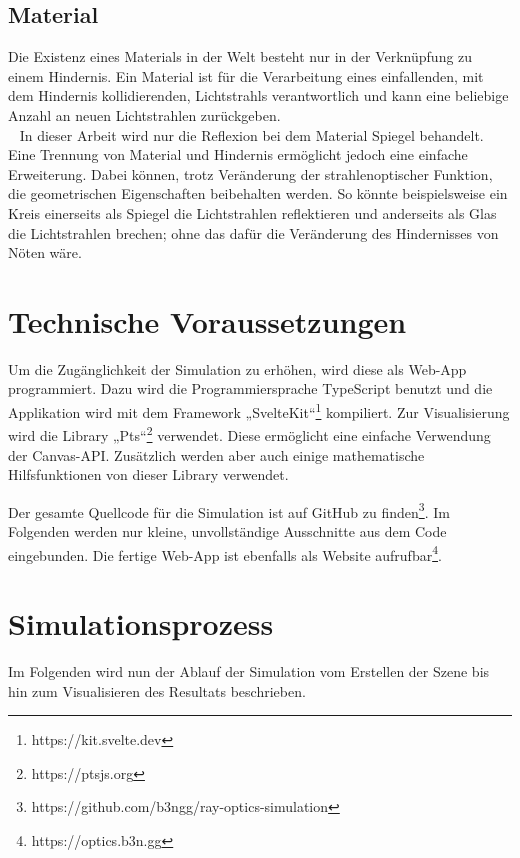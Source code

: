 \section{Material}
\label{material}
Die Existenz eines Materials  in der Welt besteht nur in der Verknüpfung zu einem Hindernis. 
Ein Material ist für die Verarbeitung eines einfallenden, mit dem Hindernis kollidierenden, Lichtstrahls verantwortlich 
und kann eine beliebige Anzahl an neuen Lichtstrahlen zurückgeben. \\ 
In dieser Arbeit wird nur die Reflexion bei dem Material Spiegel  behandelt. 
Eine Trennung von Material und Hindernis ermöglicht jedoch eine einfache Erweiterung.
Dabei können, trotz Veränderung der strahlenoptischer Funktion, die geometrischen Eigenschaften beibehalten werden.
So könnte beispielsweise ein Kreis einerseits als Spiegel die Lichtstrahlen reflektieren 
und anderseits als Glas die Lichtstrahlen brechen; ohne das dafür die Veränderung des Hindernisses von Nöten wäre.


\chapter{Technische Voraussetzungen}
Um die Zugänglichkeit der Simulation zu erhöhen, wird diese als Web-App programmiert. 
Dazu wird die Programmiersprache TypeScript benutzt und die Applikation wird mit dem Framework „SvelteKit“\footnote{https://kit.svelte.dev} kompiliert.
Zur Visualisierung wird die Library „Pts“\footnote{https://ptsjs.org} verwendet. Diese ermöglicht eine einfache Verwendung der Canvas-API. 
Zusätzlich werden aber auch einige mathematische Hilfsfunktionen von dieser Library verwendet.

Der gesamte Quellcode für die Simulation ist auf GitHub zu finden\footnote{https://github.com/b3ngg/ray-optics-simulation}. 
Im Folgenden werden nur kleine, unvollständige Ausschnitte aus dem Code eingebunden. 
Die fertige Web-App ist ebenfalls als Website aufrufbar\footnote{https://optics.b3n.gg}.


\chapter{Simulationsprozess}
Im Folgenden wird nun der Ablauf der Simulation vom Erstellen der Szene bis hin zum Visualisieren des Resultats beschrieben.

